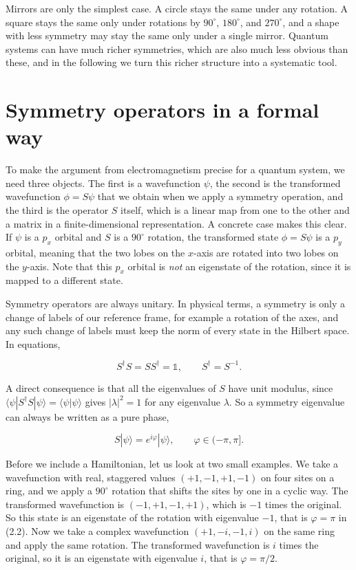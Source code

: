 Mirrors are only the simplest case. A circle stays the same under any rotation. A square stays the
same only under rotations by $90^\circ$, $180^\circ$, and $270^\circ$, and a shape with less symmetry
may stay the same only under a single mirror. Quantum systems can have much richer symmetries, which
are also much less obvious than these, and in the following we turn this richer structure into a
systematic tool.

\section{Symmetry operators in a formal way}

To make the argument from electromagnetism precise for a quantum system, we need three objects. The
first is a wavefunction $\psi$, the second is the transformed wavefunction $\phi = S\psi$ that we
obtain when we apply a symmetry operation, and the third is the operator $S$ itself, which is a
linear map from one to the other and a matrix in a finite-dimensional representation. A concrete
case makes this clear. If $\psi$ is a $p_x$ orbital and $S$ is a $90^\circ$ rotation, the
transformed state $\phi = S\psi$ is a $p_y$ orbital, meaning that the two lobes on the $x$-axis are
rotated into two lobes on the $y$-axis. Note that this $p_x$ orbital is \emph{not} an eigenstate of
the rotation, since it is mapped to a different state.

Symmetry operators are always unitary. In physical terms, a symmetry is only a change of labels of
our reference frame, for example a rotation of the axes, and any such change of labels must keep the
norm of every state in the Hilbert space. In equations,

\begin{equation}S^\dagger S = S S^\dagger = \mathbb{1}, \qquad S^\dagger = S^{-1}.\end{equation}

A direct consequence is that all the eigenvalues of $S$ have unit modulus, since $\langle\psi|S^\dagger
S|\psi\rangle = \langle\psi|\psi\rangle$ gives $|\lambda|^2=1$ for any eigenvalue $\lambda$. So a
symmetry eigenvalue can always be written as a pure phase,

\begin{equation}S|\psi\rangle = e^{i\varphi}|\psi\rangle, \qquad \varphi \in (-\pi,\pi].\end{equation}

Before we include a Hamiltonian, let us look at two small examples. We take a wavefunction with real,
staggered values $(+1,-1,+1,-1)$ on four sites on a ring, and we apply a $90^\circ$ rotation
that shifts the sites by one in a cyclic way. The transformed wavefunction is $(-1,+1,-1,+1)$, which
is $-1$ times the original. So this state is an eigenstate of the rotation with eigenvalue $-1$, that
is $\varphi=\pi$ in (2.2). Now we take a complex wavefunction $(+1,-i,-1,i)$ on the same ring and
apply the same rotation. The transformed wavefunction is $i$ times the original, so it is an
eigenstate with eigenvalue $i$, that is $\varphi=\pi/2$.

